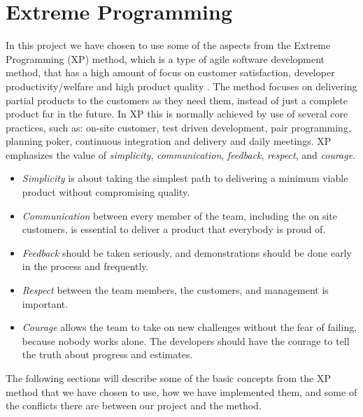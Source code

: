 
\section{Extreme Programming}
\label{sec:extreme_programming}

In this project we have chosen to use some of the aspects from the Extreme Programming (XP) method, which is a type of agile software development method, that has a high amount of focus on customer satisfaction, developer productivity/welfare and high product quality \parencite{xp}. The method focuses on delivering partial products to the customers as they need them, instead of just a complete product far in the future. In XP this is normally achieved by use of several core practices, such as: on-site customer, test driven development, pair programming, planning poker, continuous integration and delivery and daily meetings. XP emphasizes the value of \emph{simplicity}, \emph{communication}, \emph{feedback}, \emph{respect}, and \emph{courage}. 

\begin{itemize}
	\item \emph{Simplicity} is about taking the simplest path to delivering a minimum viable product without compromising quality. 
	\item \emph{Communication} between every member of the team, including the on site customers, is essential to deliver a product that everybody is proud of. 
	\item \emph{Feedback} should be taken seriously, and demonstrations should be done early in the process and frequently.
	\item \emph{Respect} between the team members, the customers, and management is important.
	\item \emph{Courage} allows the team to take on new challenges without the fear of failing, because nobody works alone. The developers should have the courage to tell the truth about progress and estimates. 
\end{itemize}

The following sections will describe some of the basic concepts from the XP method that we have chosen to use, how we have implemented them, and some of the conflicts there are between our project and the method.

